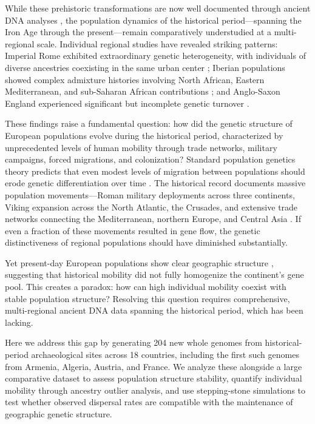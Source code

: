 \documentclass[11pt]{article}
\begin{document}
While these prehistoric transformations are now well documented through ancient DNA analyses \citep{Skoglund2016,Margaryan2020}, the population dynamics of the historical period---spanning the Iron Age through the present---remain comparatively understudied at a multi-regional scale. Individual regional studies have revealed striking patterns: Imperial Rome exhibited extraordinary genetic heterogeneity, with individuals of diverse ancestries coexisting in the same urban center \citep{Antonio2019,Moots2023}; Iberian populations showed complex admixture histories involving North African, Eastern Mediterranean, and sub-Saharan African contributions \citep{Olalde2019}; and Anglo-Saxon England experienced significant but incomplete genetic turnover \citep{Gretzinger2022}.

These findings raise a fundamental question: how did the genetic structure of European populations evolve during the historical period, characterized by unprecedented levels of human mobility through trade networks, military campaigns, forced migrations, and colonization? Standard population genetics theory predicts that even modest levels of migration between populations should erode genetic differentiation over time \citep{Wright1931,Kimura1964}. The historical record documents massive population movements---Roman military deployments across three continents, Viking expansion across the North Atlantic, the Crusades, and extensive trade networks connecting the Mediterranean, northern Europe, and Central Asia \citep{Horden2000,Broodbank2013}. If even a fraction of these movements resulted in gene flow, the genetic distinctiveness of regional populations should have diminished substantially.

Yet present-day European populations show clear geographic structure \citep{Novembre2008,Lao2008}, suggesting that historical mobility did not fully homogenize the continent's gene pool. This creates a paradox: how can high individual mobility coexist with stable population structure? Resolving this question requires comprehensive, multi-regional ancient DNA data spanning the historical period, which has been lacking.

Here we address this gap by generating 204 new whole genomes from historical-period archaeological sites across 18 countries, including the first such genomes from Armenia, Algeria, Austria, and France. We analyze these alongside a large comparative dataset to assess population structure stability, quantify individual mobility through ancestry outlier analysis, and use stepping-stone simulations to test whether observed dispersal rates are compatible with the maintenance of geographic genetic structure.
\end{document}
